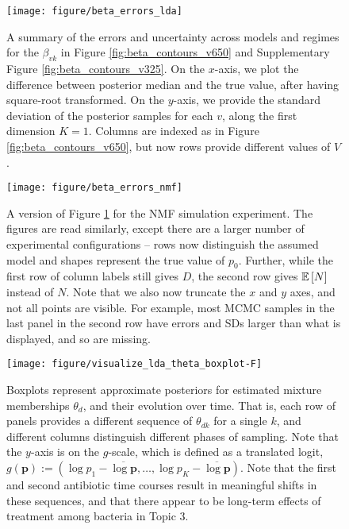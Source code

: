 \documentclass[oupdraft]{bio}
\begin{document}
\begin{figure}[!p]
  \centering
  \texttt{[image: figure/beta\_errors\_lda]}
  \caption{A summary of the errors and uncertainty across models and regimes for
    the $\beta_{vk}$ in Figure \ref{fig:beta_contours_v650} and Supplementary
    Figure \ref{fig:beta_contours_v325}. On the $x$-axis, we plot the difference
    between posterior median and the true value, after having square-root
    transformed. On the $y$-axis, we provide the standard deviation of the
    posterior samples for each $v$, along the first dimension $K = 1$. Columns
    are indexed as in Figure \ref{fig:beta_contours_v650}, but now rows provide
    different values of $V$.
    \label{fig:beta_errors_lda} }
\end{figure}

\begin{figure}[!p]
  \centering
  \texttt{[image: figure/beta\_errors\_nmf]}
  \caption{A version of Figure \ref{fig:beta_errors_lda} for the NMF simulation
    experiment. The figures are read similarly, except there are a larger number
    of experimental configurations -- rows now distinguish the assumed model and
    shapes represent the true value of $p_{0}$. Further, while the first row of
    column labels still gives $D$, the second row gives $\mathbb{E}\left[{N}\right]$ instead of
    $N$. Note that we also now truncate the $x$ and $y$ axes, and not all points
    are visible. For example, most MCMC samples in the last panel in the second
    row have errors and SDs larger than what is displayed, and so are
    missing. \label{fig:beta_errors_nmf}}
\end{figure}

\begin{figure}[!p]
  \centering\texttt{[image: figure/visualize\_lda\_theta\_boxplot-F]}
  \caption{Boxplots represent approximate posteriors for estimated mixture
    memberships $\theta_{d}$, and their evolution over time. That is, each row
    of panels provides a different sequence of $\theta_{dk}$ for a single $k$,
    and different columns distinguish different phases of sampling. Note that
    the $y$-axis is on the $g$-scale, which is defined as a translated logit,
    $g\left(\mathbf{p}\right) := \left(\log p_{1} - \overline{\log \mathbf{p}},
    \dots,\log p_{K} - \overline{\log \mathbf{p}}\right)$. Note that the first
    and second antibiotic time courses result in meaningful shifts in these
    sequences, and that there appear to be long-term effects of treatment among
    bacteria in Topic 3. \label{fig:antibiotics_lda_theta}}
\end{figure}
\end{document}
